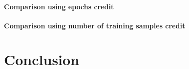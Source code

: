 \documentclass[11pt]{article}
\theoremstyle{t}
\begin{document}
\paragraph{Comparison using epochs credit}


\paragraph{Comparison using number of training samples credit}

\section{Conclusion}


\newpage
\linespread{1.1}
\normalsize




\linespread{1}
\newpage

\appendix
\end{document}
